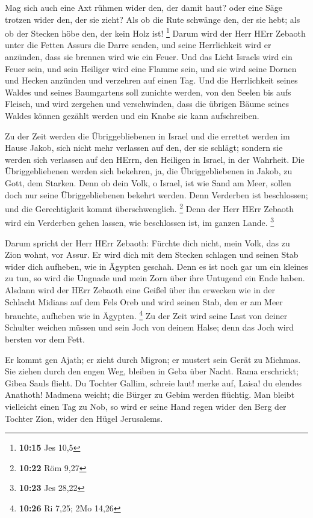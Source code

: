  Mag sich auch eine Axt rühmen wider den, der damit haut?
oder eine Säge trotzen wider den, der sie zieht? Als ob die Rute
schwänge den, der sie hebt; als ob der Stecken höbe den, der kein Holz
ist! \footnote{\textbf{10:15} Jes 10,5}  Darum wird der
Herr HErr Zebaoth unter die Fetten Assurs die Darre senden, und seine
Herrlichkeit wird er anzünden, dass sie brennen wird wie ein Feuer.
 Und das Licht Israels wird ein Feuer sein, und sein
Heiliger wird eine Flamme sein, und sie wird seine Dornen und Hecken
anzünden und verzehren auf einen Tag.  Und die Herrlichkeit
seines Waldes und seines Baumgartens soll zunichte werden, von den
Seelen bis aufs Fleisch, und wird zergehen und verschwinden,
 dass die übrigen Bäume seines Waldes können gezählt werden
und ein Knabe sie kann aufschreiben.

 Zu der Zeit werden die Übriggebliebenen in Israel und die
errettet werden im Hause Jakob, sich nicht mehr verlassen auf den, der
sie schlägt; sondern sie werden sich verlassen auf den HErrn, den
Heiligen in Israel, in der Wahrheit.  Die Übriggebliebenen
werden sich bekehren, ja, die Übriggebliebenen in Jakob, zu Gott, dem
Starken.  Denn ob dein Volk, o Israel, ist wie Sand am
Meer, sollen doch nur seine Übriggebliebenen bekehrt werden. Denn
Verderben ist beschlossen; und die Gerechtigkeit kommt überschwenglich.
\footnote{\textbf{10:22} Röm 9,27}  Denn der Herr HErr
Zebaoth wird ein Verderben gehen lassen, wie beschlossen ist, im ganzen
Lande. \footnote{\textbf{10:23} Jes 28,22}

 Darum spricht der Herr HErr Zebaoth: Fürchte dich nicht,
mein Volk, das zu Zion wohnt, vor Assur. Er wird dich mit dem Stecken
schlagen und seinen Stab wider dich aufheben, wie in Ägypten geschah.
 Denn es ist noch gar um ein kleines zu tun, so wird die
Ungnade und mein Zorn über ihre Untugend ein Ende haben. 
Alsdann wird der HErr Zebaoth eine Geißel über ihn erwecken wie in der
Schlacht Midians auf dem Fels Oreb und wird seinen Stab, den er am Meer
brauchte, aufheben wie in Ägypten. \footnote{\textbf{10:26} Ri 7,25; 2Mo
  14,26}  Zu der Zeit wird seine Last von deiner Schulter
weichen müssen und sein Joch von deinem Halse; denn das Joch wird
bersten vor dem Fett.

 Er kommt gen Ajath; er zieht durch Migron; er mustert sein
Gerät zu Michmas.  Sie ziehen durch den engen Weg, bleiben
in Geba über Nacht. Rama erschrickt; Gibea Sauls flieht. 
Du Tochter Gallim, schreie laut! merke auf, Laisa! du elendes Anathoth!
 Madmena weicht; die Bürger zu Gebim werden flüchtig.
 Man bleibt vielleicht einen Tag zu Nob, so wird er seine
Hand regen wider den Berg der Tochter Zion, wider den Hügel Jerusalems.


